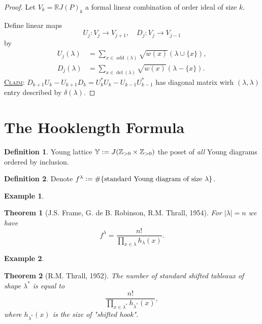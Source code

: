 \documentclass{report}
\newcommand{\R}{\mathbb{R}}
\newcommand{\Z}{\mathbb{Z}}
\def \del {\operatorname{del}}
\def \add {\operatorname{add}}
\newcommand{\defeq}{\vcentcolon=}
\newcommand{\fancyem}[1]{\underline{\textsc{#1}}}
\newtheorem{theorem}{Theorem}[section]
\theoremstyle{definition}
\newtheorem{definition}{Definition}[section]
\newtheorem{example}{Example}[section]
\theoremstyle{remark}
\numberwithin{equation}{section}
\begin{document}
\begin{proof}
    Let $V_k = \R J(P)_k$ a formal linear combination of order ideal of size $k$.

    Define linear maps \[
        U_j: V_j \to V_{j + 1}, \quad D_j: V_j \to V_{j - 1}    
    \] by \begin{align*}
        U_j(\lambda) & = \sum_{x \in \add(\lambda)} \sqrt{w(x)}\left(\lambda \cup \{x\}\right), \\
        D_j(\lambda) & = \sum_{x \in \del(\lambda)} \sqrt{w(x)}\left(\lambda - \{x\}\right).
    \end{align*}
    \fancyem{Claim}: $D_{k+1}U_k - U_{k+1}D_k = U^*_kU_k - U_{k-1}U^*_{k-1}$ has diagonal matrix wirh $(\lambda, \lambda)$ entry described by $\delta(\lambda)$.
\end{proof}


\section{The Hooklength Formula}
\begin{definition}
    Young lattice $\mathbb{Y} \defeq J(\Z_{> 0} \times \Z_{> 0})$ the poset of \emph{all} Young diagrams ordered by inclusion.
\end{definition}

\begin{definition}
    Denote $f^\lambda \defeq \#\{\text{standard Young diagram of size } \lambda\}$.
\end{definition}

\begin{example}
    
\end{example}

\begin{theorem}[J.S. Frame, G. de B. Robinson, R.M. Thrall, 1954]
    For $|\lambda| = n$ we have \[
        f^\lambda = \frac{n!}{\prod_{x \in \lambda}h_\lambda(x)}.    
    \]
\end{theorem}

\begin{example}
    
\end{example}

\begin{theorem}[R.M. Thrall, 1952]
    The number of standard shifted tableaux of shape $\lambda^*$ is equal to \[
        \frac{n!}{\prod_{x \in \lambda^*} h_{\lambda^*}(x)}, 
    \] where $h_{\lambda^*}(x)$ is the size of "shifted hook".
\end{theorem}
\end{document}
